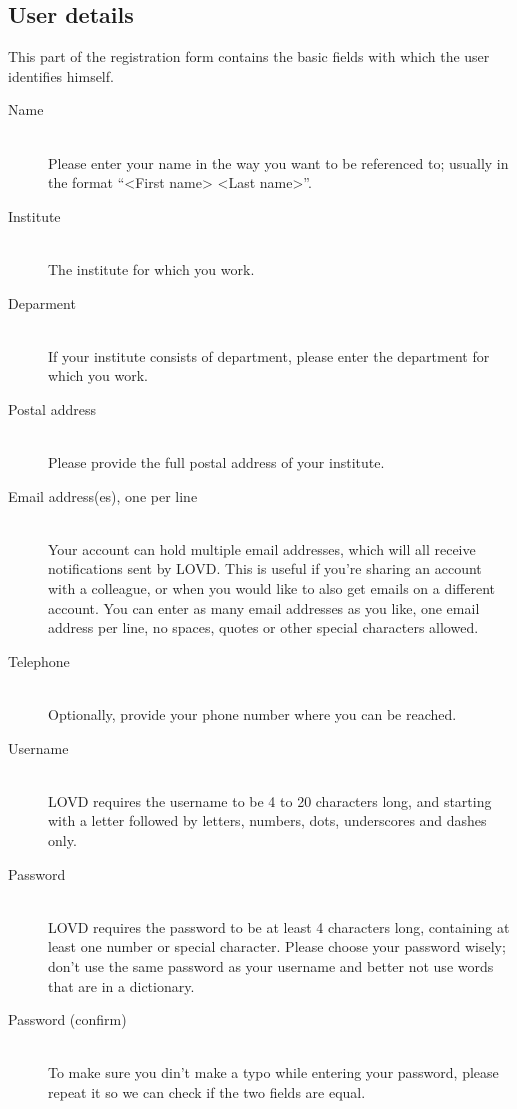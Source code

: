 \documentclass[a4paper,oneside,openany,12pt]{memoir}
\begin{document}
\pagebreak[4] %
\subsection{User details}
This part of the registration form contains the basic fields with which the user identifies himself.
\begin{description}
  \item[Name] \hfill \\
  Please enter your name in the way you want to be referenced to; usually in the format ``<First name> <Last name>''.
  \item[Institute] \hfill \\
  The institute for which you work.
  \item[Deparment] \hfill \\
  If your institute consists of department, please enter the department for which you work.
  \item[Postal address] \hfill \\
  Please provide the full postal address of your institute.
  \item[Email address(es), one per line] \hfill \\
  Your account can hold multiple email addresses, which will all receive notifications sent by LOVD.
  This is useful if you're sharing an account with a colleague, or when you would like to also get emails on a different account.
  You can enter as many email addresses as you like, one email address per line, no spaces, quotes or other special characters allowed.
  \item[Telephone] \hfill \\
  Optionally, provide your phone number where you can be reached.
  \item[Username] \hfill \\
  LOVD requires the username to be 4 to 20 characters long, and starting with a letter followed by letters, numbers, dots, underscores and dashes only.
  \item[Password] \hfill \\
  LOVD requires the password to be at least 4 characters long, containing at least one number or special character.
  Please choose your password wisely; don't use the same password as your username and better not use words that are in a dictionary.
  \item[Password (confirm)] \hfill \\
  To make sure you din't make a typo while entering your password, please repeat it so we can check if the two fields are equal.
\end{description}
\end{document}
